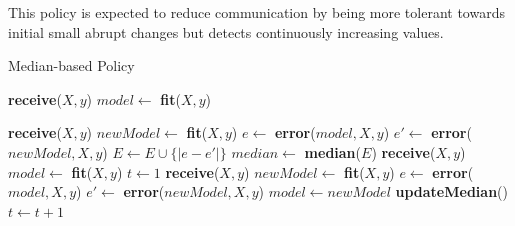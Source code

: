 \documentclass{mpaper}
\begin{document}
This policy is expected to reduce communication by being more tolerant towards initial small abrupt changes but detects continuously increasing values.

    


\begin{algorithm}[h!]
\caption{Median-based Policy}\label{polM}
\begin{algorithmic}
    \State \textbf{receive}($X, y$)
    \State $model \gets$ \textbf{fit}($X,y$)
    
        \State \textbf{receive}($X, y$)
        \State $newModel \gets$ \textbf{fit}($X,y$)
        \State $e \gets$ \textbf{error}($model,X,y$)
        \State $e' \gets$ \textbf{error}($newModel,X,y$)
        \State $E \gets E \cup \{\mid e - e' \mid\}$
    \EndFor
    \State $median \gets$ \textbf{median}($E$)
\EndProcedure
\State \textbf{receive}($X, y$)
\State $model \gets$ \textbf{fit}($X,y$)
\State $t \gets 1$
    \State \textbf{receive}($X, y$)
    \State $newModel \gets$ \textbf{fit}($X,y$)
    \State $e \gets$ \textbf{error}($model,X,y$)
    \State $e' \gets$ \textbf{error}($newModel,X,y$)
        \State $model \gets newModel$ 
    \EndIf
        \State \textbf{updateMedian}()
    \EndIf
    \State $t \gets t + 1$
\EndWhile
\end{algorithmic}
\end{algorithm}
\end{document}
